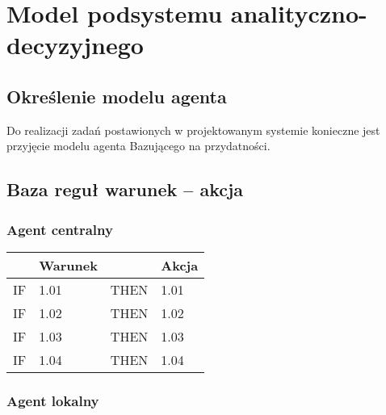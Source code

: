 \section{Model podsystemu analityczno-decyzyjnego}
\subsection{Określenie modelu agenta}
Do realizacji zadań postawionych w projektowanym systemie konieczne jest przyjęcie modelu agenta Bazującego na przydatności.

\subsection{Baza reguł warunek – akcja}

\subsubsection{Agent centralny}

\begin{tabular}{c|p{7cm}|c|p{7cm}}
 & Warunek & & Akcja\\
\hline
IF & 1.01 & THEN & 1.01\\
IF & 1.02 & THEN & 1.02\\
IF & 1.03 & THEN & 1.03\\
IF & 1.04 & THEN & 1.04\\
\end{tabular}

\subsubsection{Agent lokalny}

